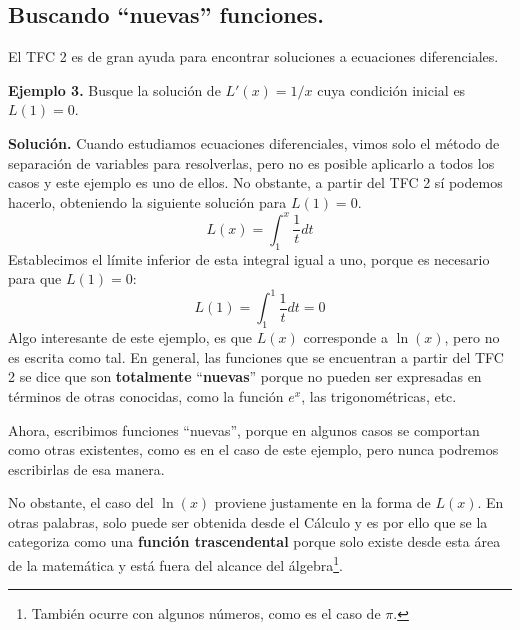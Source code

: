 \documentclass[12pt]{article}
\begin{document}
\subsection{Buscando ``nuevas'' funciones.}

El TFC 2 es de gran ayuda para encontrar soluciones a ecuaciones diferenciales.

\textbf{Ejemplo 3.} \quad Busque la solución de $L'(x) = 1/x$ cuya condición inicial es $L(1) = 0$.

\textbf{Solución.} \quad Cuando estudiamos ecuaciones diferenciales, vimos solo el método de separación de variables para resolverlas, pero no es posible aplicarlo a todos los casos y este ejemplo es uno de ellos. No obstante, a partir del TFC 2 sí podemos hacerlo, obteniendo la siguiente solución para $L(1) = 0$.
\[
  L(x) = \int_{1}^{x} \frac{1}{t} dt
\]
Establecimos el límite inferior de esta integral igual a uno, porque es necesario para que $L(1) = 0$:
\[
  L(1) = \int_{1}^{1} \frac{1}{t} dt = 0
\]
Algo interesante de este ejemplo, es que $L(x)$ corresponde a $\ln(x)$, pero no es escrita como tal. En general, las funciones que se encuentran a partir del TFC 2 se dice que son \textbf{totalmente} ``\textbf{nuevas}'' porque no pueden ser expresadas en términos de otras conocidas, como la función $e^{x}$, las trigonométricas, etc.

Ahora, escribimos funciones ``nuevas'', porque en algunos casos se comportan como otras existentes, como es en el caso de este ejemplo, pero nunca podremos escribirlas de esa manera.

No obstante, el caso del $\ln(x)$ proviene justamente en la forma de $L(x)$. En otras palabras, solo puede ser obtenida desde el Cálculo y es por ello que se la categoriza como una \textbf{función trascendental} porque solo existe desde esta área de la matemática y está fuera del alcance del álgebra\footnote{También ocurre con algunos números, como es el caso de $\pi$.}.
\end{document}
